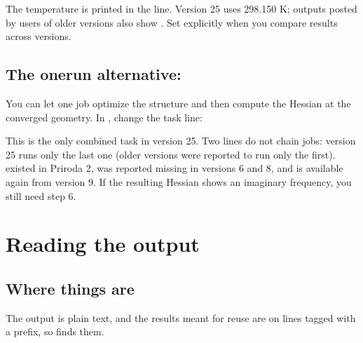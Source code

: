 \documentclass[letterpaper,10pt,english,openany,oneside]{sphinxmanual}
\begin{document}
\sphinxAtStartPar
The temperature is printed in the  line. Version 25 uses 298.150 K; outputs posted by users of older versions
also show . Set {\hyperref[\detokenize{reference/thermo:thermo-temperature}]{}} explicitly when you compare results across versions.




\subsection{The one\sphinxhyphen{}run alternative: }
\label{\detokenize{start/getting-started:the-one-run-alternative-task-optimize-hessian}}
\sphinxAtStartPar
You can let one job optimize the structure and then compute the Hessian at the converged geometry. In ,
change the task line:

\begin{sphinxVerbatim}[commandchars=\\\{\}]
\end{sphinxVerbatim}



\sphinxAtStartPar
This is the only combined task in version 25. Two  lines do not chain jobs: version 25 runs only the last
one (older versions were reported to run only the first).  existed in Priroda 2, was reported missing in versions 6 and 8, and is available
again from version 9. If the resulting Hessian shows an imaginary frequency, you still need step 6.




\section{Reading the output}
\label{\detokenize{start/getting-started:reading-the-output}}\label{\detokenize{start/getting-started:qs-reading-output}}

\subsection{Where things are}
\label{\detokenize{start/getting-started:where-things-are}}
\sphinxAtStartPar
The output is plain text, and the results meant for reuse are on lines tagged with a prefix, so  finds them.
\end{document}
